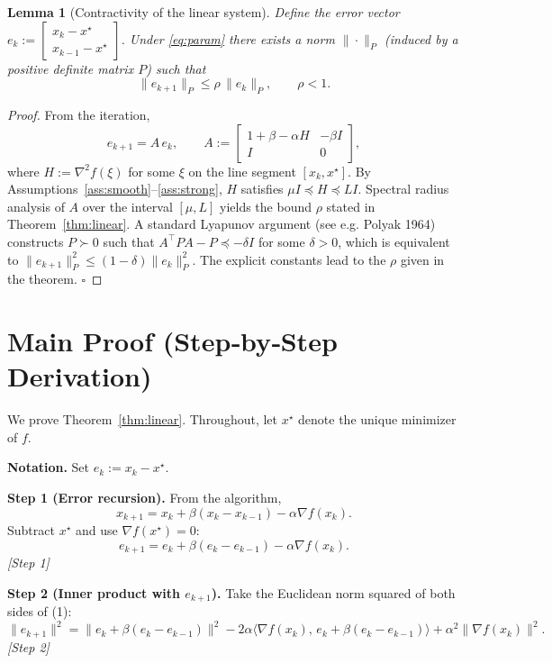 \documentclass[11pt]{article}
\newtheorem{lemma}{Lemma}
\begin{document}
\begin{lemma}[Contractivity of the linear system]\label{lem:contract}
Define the error vector $e_k:=\begin{bmatrix}x_k-x^{\star}\\ x_{k-1}-x^{\star}\end{bmatrix}$.  
Under \eqref{eq:param} there exists a norm $\|\cdot\|_{P}$ (induced by a positive definite matrix $P$) such that
\[
\|e_{k+1}\|_{P}\le\rho\,\|e_{k}\|_{P},\qquad \rho<1.
\]
\end{lemma}
\begin{proof}
From the iteration,
\[
e_{k+1}=A\,e_{k},\qquad 
A:=\begin{bmatrix} 1+\beta-\alpha H & -\beta I\\ I & 0\end{bmatrix},
\]
where $H:=\nabla^{2}f(\xi)$ for some $\xi$ on the line segment $[x_k,x^{\star}]$. By Assumptions~\ref{ass:smooth}–\ref{ass:strong}, $H$ satisfies $\mu I\preceq H\preceq L I$. Spectral radius analysis of $A$ over the interval $[\mu,L]$ yields the bound $\rho$ stated in Theorem~\ref{thm:linear}. A standard Lyapunov argument (see e.g. Polyak 1964) constructs $P\succ0$ such that $A^{\!\top}PA-P\preceq -\delta I$ for some $\delta>0$, which is equivalent to $\|e_{k+1}\|_{P}^{2}\le(1-\delta)\|e_{k}\|_{P}^{2}$. The explicit constants lead to the $\rho$ given in the theorem. \hfill $\square$
\end{proof}

\section*{Main Proof (Step‑by‑Step Derivation)}
We prove Theorem~\ref{thm:linear}. Throughout, let $x^{\star}$ denote the unique minimizer of $f$.

\noindent\textbf{Notation.} Set $e_k:=x_k-x^{\star}$.  

\noindent\textbf{Step 1 (Error recursion).}  
From the algorithm,
\[
x_{k+1}=x_k+\beta(x_k-x_{k-1})-\alpha\nabla f(x_k).
\]
Subtract $x^{\star}$ and use $\nabla f(x^{\star})=0$:
\[
e_{k+1}=e_k+\beta(e_k-e_{k-1})-\alpha\nabla f(x_k). \tag{1}
\]
\textit{[Step 1]}

\noindent\textbf{Step 2 (Inner product with $e_{k+1}$).}  
Take the Euclidean norm squared of both sides of (1):
\[
\|e_{k+1}\|^{2}= \|e_k+\beta(e_k-e_{k-1})\|^{2}
        -2\alpha\langle\nabla f(x_k),\,e_k+\beta(e_k-e_{k-1})\rangle
        +\alpha^{2}\|\nabla f(x_k)\|^{2}. \tag{2}
\]
\textit{[Step 2]}
\end{document}
